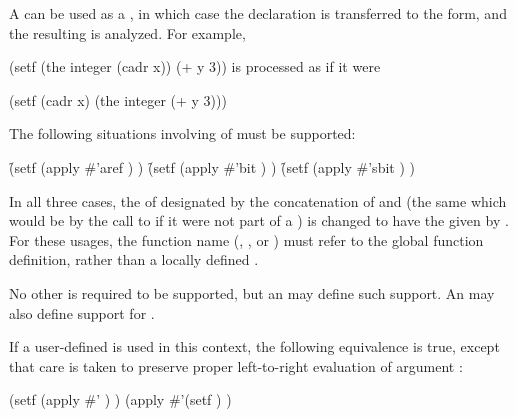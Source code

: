 A   can be used as a ,
in which case the declaration is transferred to the  form,
and the resulting  is analyzed.  For example,

\code
 (setf (the integer (cadr x)) (+ y 3))
\endcode
is processed as if it were

\code
 (setf (cadr x) (the integer (+ y 3)))
\endcode

\endsubsubsection%
     

The following situations involving  of  must be supported:

\beginlist
\itemitem{\bull} \f{(setf (apply \#'aref 
					)
			  )}
\itemitem{\bull} \f{(setf (apply \#'bit  
				       )
			  )}
\itemitem{\bull} \f{(setf (apply \#'sbit  
					) 
			  )}
\endlist

In all three cases, the  of  designated
by the concatenation of  and 
(\ie the same  which would be  by the call to
      if it were not part of a  )
is changed to have the  given by .
For these usages, the function name (, , or )
must refer to the global function definition, rather than a locally defined
.

No other   is required to be supported,
but an  may define such support.
An  may also define support 
for  .

If a user-defined  is used in this context,
the following equivalence is true, except that care is taken
to preserve proper left-to-right evaluation of argument :

\code
 (setf (apply \#' ) )
 \EQ (apply \#'(setf )  )
\endcode

